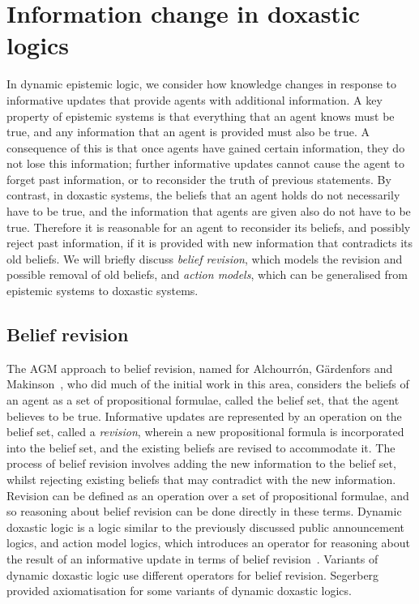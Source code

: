 \section{Information change in doxastic logics}

In dynamic epistemic logic, we consider how knowledge changes in response to
informative updates that provide agents with additional information. A key
property of epistemic systems is that everything that an agent knows must be
true, and any information that an agent is provided must also be true. A
consequence of this is that once agents have gained certain information, they do
not lose this information; further informative updates cannot cause the agent to
forget past information, or to reconsider the truth of previous statements. By
contrast, in doxastic systems, the beliefs that an agent holds do not
necessarily have to be true, and the information that agents are given also do
not have to be true. Therefore it is reasonable for an agent to reconsider its
beliefs, and possibly reject past information, if it is provided with new
information that contradicts its old beliefs. We will briefly discuss {\em
belief revision}, which models the revision and possible removal of old beliefs,
and {\em action models}, which can be generalised from epistemic systems to
doxastic systems.

\subsection{Belief revision}

The AGM approach to belief revision, named for Alchourrón, Gärdenfors and
Makinson~\cite{alchourron1985logic}, who did much of the initial work in this
area, considers the beliefs of an agent as a set of propositional formulae,
called the belief set, that the agent believes to be true. Informative updates
are represented by an operation on the belief set, called a {\em revision},
wherein a new propositional formula is incorporated into the belief set, and the
existing beliefs are revised to accommodate it. The process of belief revision
involves adding the new information to the belief set, whilst rejecting existing
beliefs that may contradict with the new information. Revision can be defined as
an operation over a set of propositional formulae, and so reasoning about belief
revision can be done directly in these terms. Dynamic doxastic logic is a logic
similar to the previously discussed public announcement logics, and action model
logics, which introduces an operator for reasoning about the result of an
informative update in terms of belief revision~\cite{vanditmarsch2007dynamic}.
Variants of dynamic doxastic logic use different operators for belief revision.
Segerberg~\cite{segerberg2001basic} provided axiomatisation for some variants of
dynamic doxastic logics.

